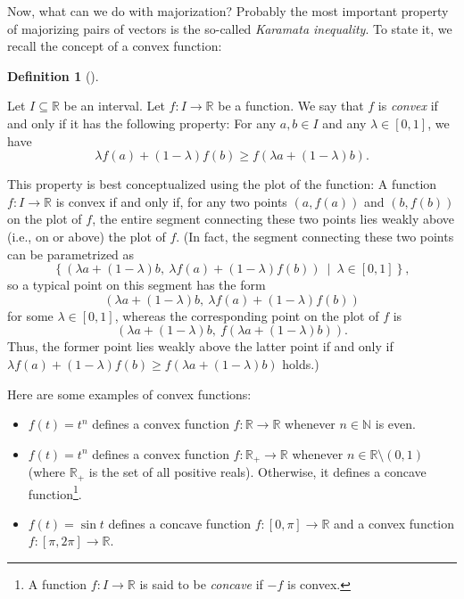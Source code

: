 \documentclass[numbers=enddot,12pt,final,onecolumn,notitlepage]{scrartcl}%
\numberwithin{exer}{subsection}
\theoremstyle{definition}
\newtheorem{defi}[theo]{Definition}
\newenvironment{definition}[1][]
{\begin{defi}[#1]\begin{leftbar}}
{\end{leftbar}\end{defi}}
\begin{document}
Now, what can we do with majorization? Probably the most important property of
majorizing pairs of vectors is the so-called \emph{Karamata inequality}. To
state it, we recall the concept of a convex function:

\begin{definition}
\label{def.major.convex}Let $I\subseteq\mathbb{R}$ be an interval. Let
$f:I\rightarrow\mathbb{R}$ be a function. We say that $f$ is \emph{convex} if
and only if it has the following property: For any $a,b\in I$ and any
$\lambda\in\left[  0,1\right]  $, we have%
\[
\lambda f\left(  a\right)  +\left(  1-\lambda\right)  f\left(  b\right)  \geq
f\left(  \lambda a+\left(  1-\lambda\right)  b\right)  .
\]

\end{definition}

This property is best conceptualized using the plot of the function: A
function $f:I\rightarrow\mathbb{R}$ is convex if and only if, for any two
points $\left(  a,f\left(  a\right)  \right)  $ and $\left(  b,f\left(
b\right)  \right)  $ on the plot of $f$, the entire segment connecting these
two points lies weakly above (i.e., on or above) the plot of $f$. (In fact,
the segment connecting these two points can be parametrized as
\[
\left\{  \left(  \lambda a+\left(  1-\lambda\right)  b,\ \lambda f\left(
a\right)  +\left(  1-\lambda\right)  f\left(  b\right)  \right)
\ \mid\ \lambda\in\left[  0,1\right]  \right\}  ,
\]
so a typical point on this segment has the form
\[
\left(  \lambda a+\left(  1-\lambda\right)  b,\ \lambda f\left(  a\right)
+\left(  1-\lambda\right)  f\left(  b\right)  \right)
\]
for some $\lambda\in\left[  0,1\right]  $, whereas the corresponding point on
the plot of $f$ is
\[
\left(  \lambda a+\left(  1-\lambda\right)  b,\ f\left(  \lambda a+\left(
1-\lambda\right)  b\right)  \right)  .
\]
Thus, the former point lies weakly above the latter point if and only if
$\lambda f\left(  a\right)  +\left(  1-\lambda\right)  f\left(  b\right)  \geq
f\left(  \lambda a+\left(  1-\lambda\right)  b\right)  $ holds.)

Here are some examples of convex functions:

\begin{itemize}
\item $f\left(  t\right)  =t^{n}$ defines a convex function $f:\mathbb{R}%
\rightarrow\mathbb{R}$ whenever $n\in\mathbb{N}$ is even.

\item $f\left(  t\right)  =t^{n}$ defines a convex function $f:\mathbb{R}%
_{+}\rightarrow\mathbb{R}$ whenever $n\in\mathbb{R}\setminus\left(
0,1\right)  $ (where $\mathbb{R}_{+}$ is the set of all positive reals).
Otherwise, it defines a concave function\footnote{A function $f:I\rightarrow
\mathbb{R}$ is said to be \emph{concave} if $-f$ is convex.}.

\item $f\left(  t\right)  =\sin t$ defines a concave function $f:\left[
0,\pi\right]  \rightarrow\mathbb{R}$ and a convex function $f:\left[  \pi
,2\pi\right]  \rightarrow\mathbb{R}$.
\end{itemize}
\end{document}
